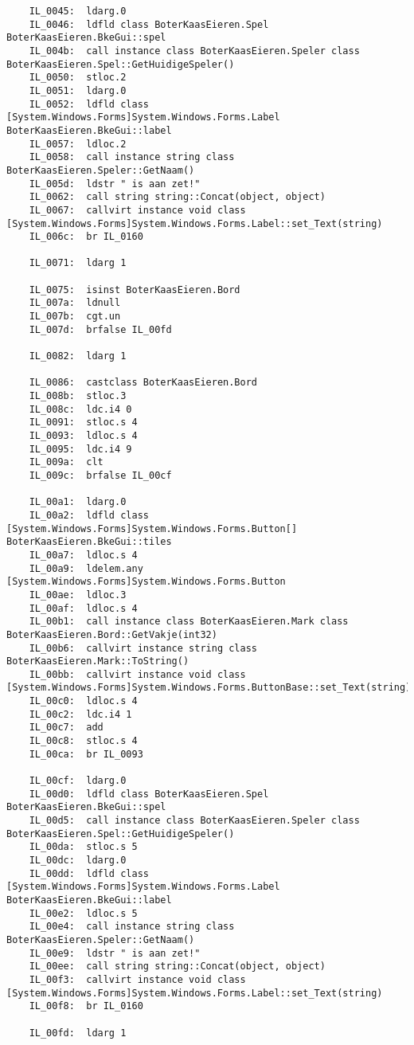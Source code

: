\begin{lstlisting}
	IL_0045:  ldarg.0 
	IL_0046:  ldfld class BoterKaasEieren.Spel BoterKaasEieren.BkeGui::spel
	IL_004b:  call instance class BoterKaasEieren.Speler class BoterKaasEieren.Spel::GetHuidigeSpeler()
	IL_0050:  stloc.2 
	IL_0051:  ldarg.0 
	IL_0052:  ldfld class [System.Windows.Forms]System.Windows.Forms.Label BoterKaasEieren.BkeGui::label
	IL_0057:  ldloc.2 
	IL_0058:  call instance string class BoterKaasEieren.Speler::GetNaam()
	IL_005d:  ldstr " is aan zet!"
	IL_0062:  call string string::Concat(object, object)
	IL_0067:  callvirt instance void class [System.Windows.Forms]System.Windows.Forms.Label::set_Text(string)
	IL_006c:  br IL_0160

	IL_0071:  ldarg 1

	IL_0075:  isinst BoterKaasEieren.Bord
	IL_007a:  ldnull 
	IL_007b:  cgt.un 
	IL_007d:  brfalse IL_00fd

	IL_0082:  ldarg 1

	IL_0086:  castclass BoterKaasEieren.Bord
	IL_008b:  stloc.3 
	IL_008c:  ldc.i4 0
	IL_0091:  stloc.s 4
	IL_0093:  ldloc.s 4
	IL_0095:  ldc.i4 9
	IL_009a:  clt 
	IL_009c:  brfalse IL_00cf

	IL_00a1:  ldarg.0 
	IL_00a2:  ldfld class [System.Windows.Forms]System.Windows.Forms.Button[] BoterKaasEieren.BkeGui::tiles
	IL_00a7:  ldloc.s 4
	IL_00a9:  ldelem.any [System.Windows.Forms]System.Windows.Forms.Button
	IL_00ae:  ldloc.3 
	IL_00af:  ldloc.s 4
	IL_00b1:  call instance class BoterKaasEieren.Mark class BoterKaasEieren.Bord::GetVakje(int32)
	IL_00b6:  callvirt instance string class BoterKaasEieren.Mark::ToString()
	IL_00bb:  callvirt instance void class [System.Windows.Forms]System.Windows.Forms.ButtonBase::set_Text(string)
	IL_00c0:  ldloc.s 4
	IL_00c2:  ldc.i4 1
	IL_00c7:  add 
	IL_00c8:  stloc.s 4
	IL_00ca:  br IL_0093

	IL_00cf:  ldarg.0 
	IL_00d0:  ldfld class BoterKaasEieren.Spel BoterKaasEieren.BkeGui::spel
	IL_00d5:  call instance class BoterKaasEieren.Speler class BoterKaasEieren.Spel::GetHuidigeSpeler()
	IL_00da:  stloc.s 5
	IL_00dc:  ldarg.0 
	IL_00dd:  ldfld class [System.Windows.Forms]System.Windows.Forms.Label BoterKaasEieren.BkeGui::label
	IL_00e2:  ldloc.s 5
	IL_00e4:  call instance string class BoterKaasEieren.Speler::GetNaam()
	IL_00e9:  ldstr " is aan zet!"
	IL_00ee:  call string string::Concat(object, object)
	IL_00f3:  callvirt instance void class [System.Windows.Forms]System.Windows.Forms.Label::set_Text(string)
	IL_00f8:  br IL_0160

	IL_00fd:  ldarg 1


\end{lstlisting}
